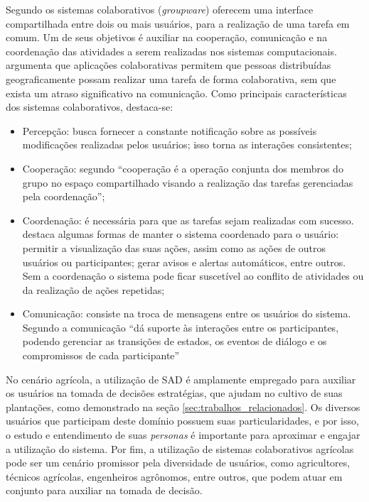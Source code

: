 \documentclass[12pt]{article}
\begin{document}
Segundo  os sistemas colaborativos (\textit{groupware}) oferecem uma interface compartilhada entre dois ou mais usuários, para a realização de uma tarefa em comum. Um de seus objetivos é auxiliar na cooperação, comunicação e na coordenação das atividades a serem realizadas nos sistemas computacionais.  argumenta que aplicações colaborativas permitem que pessoas distribuídas geograficamente possam realizar uma tarefa de forma colaborativa, sem que exista um atraso significativo na comunicação. Como principais características dos sistemas colaborativos, destaca-se:

\begin{itemize}
	\item Percepção: busca fornecer a constante notificação sobre as possíveis modificações realizadas pelos usuários; isso torna as interações consistentes;
	\item Cooperação: segundo \cite{Fuks:2003} ``cooperação é a operação conjunta dos membros do grupo no espaço compartilhado visando a realização das tarefas gerenciadas pela coordenação'';
	\item Coordenação: é necessária para que as tarefas sejam realizadas com sucesso.  destaca algumas formas de manter o sistema coordenado para o usuário: permitir a visualização das suas ações, assim como as ações de outros usuários ou participantes; gerar avisos e alertas automáticos, entre outros. Sem a coordenação o sistema pode ficar suscetível ao conflito de atividades ou da realização de ações repetidas;
	\item Comunicação: consiste na troca de mensagens entre os usuários do sistema. Segundo \cite{Fuks:2003} a comunicação ``dá suporte às interações entre os participantes, podendo gerenciar as transições de estados, os eventos de diálogo e os compromissos de cada participante''
\end{itemize}

No cenário agrícola, a utilização de SAD é amplamente empregado para auxiliar os usuários na tomada de decisões estratégias, que ajudam no cultivo de suas plantações, como demonstrado na seção \ref{sec:trabalhos_relacionados}. Os diversos usuários que participam deste domínio possuem suas particularidades, e por isso, o estudo e entendimento de suas \textit{personas} é importante para aproximar e engajar a utilização do sistema. Por fim, a utilização de sistemas colaborativos agrícolas pode ser um cenário promissor pela diversidade de usuários, como agricultores, técnicos agrícolas, engenheiros agrônomos, entre outros, que podem atuar em conjunto para auxiliar na tomada de decisão.
\end{document}

